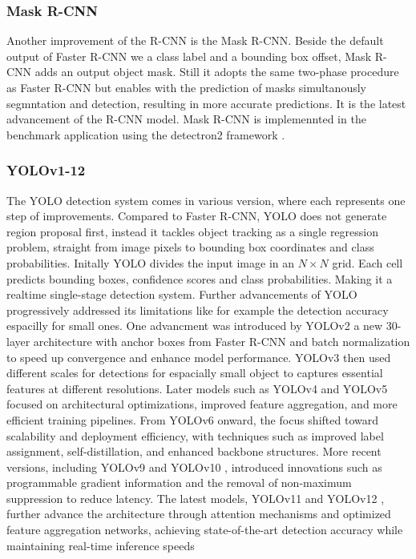 \subsubsection{Mask R-CNN}
Another improvement of the R-CNN is the Mask R-CNN. Beside the default output of Faster R-CNN we
a class label and a bounding box offset, Mask R-CNN adds an output object mask. Still it adopts
the same two-phase procedure as Faster R-CNN but enables with the prediction of masks simultanously segmntation and detection, resulting in more accurate predictions. It is the latest advancement of the R-CNN model. Mask R-CNN 
is implemennted in the benchmark application using the detectron2 framework \cite{}.

\subsubsection{YOLOv1-12}
The YOLO detection system comes in various version, where each represents one step of improvements.
Compared to Faster R-CNN, YOLO does not generate region proposal first, instead it
tackles object tracking as a single regression problem, straight from image pixels 
to bounding box coordinates and class probabilities. Initally YOLO divides the input
image in an $N \times N$ grid. Each cell predicts bounding boxes, confidence scores 
and class probabilities. Making it a realtime single-stage detection system. \cite{yolo}
Further advancements of YOLO progressively addressed its limitations like for example the detection accuracy espacilly for small ones. 
One advancment was introduced by YOLOv2 a new 30-layer architecture with anchor boxes from Faster R-CNN and batch normalization to speed up convergence and enhance model performance. \cite{yolov2}
YOLOv3 then used different scales for detections for espacially small object to captures 
essential features at different resolutions. \cite{yolov3}
Later models such as YOLOv4 \cite{yolov4} and YOLOv5 \cite{yolov5} focused on architectural optimizations, improved feature aggregation, and more efficient training pipelines.
From YOLOv6 \cite{yolov6} onward, the focus shifted toward scalability and deployment efficiency, with techniques such as improved label assignment, self-distillation, and enhanced backbone structures. More recent versions, including YOLOv9 \cite{yolov9} and YOLOv10 \cite{yolov10}, introduced innovations such as programmable gradient information and the removal of non-maximum suppression to reduce latency. The latest models, YOLOv11 \cite{yolov11} and YOLOv12 \cite{yolov12}, further advance the architecture through attention mechanisms and optimized feature aggregation networks, achieving state-of-the-art detection accuracy while maintaining real-time inference speeds

